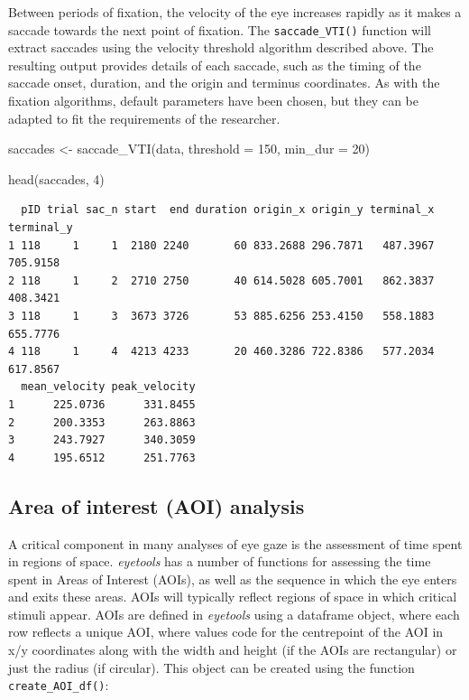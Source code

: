 \documentclass[
  man,
  floatsintext,
  longtable,
  nolmodern,
  notxfonts,
  notimes,
  colorlinks=true,linkcolor=blue,citecolor=blue,urlcolor=blue]{apa7}
\newenvironment{Shaded}{\begin{snugshade}}{\end{snugshade}}
\newcommand{\AttributeTok}[1]{\textcolor[rgb]{0.40,0.45,0.13}{#1}}
\newcommand{\DecValTok}[1]{\textcolor[rgb]{0.68,0.00,0.00}{#1}}
\newcommand{\FunctionTok}[1]{\textcolor[rgb]{0.28,0.35,0.67}{#1}}
\newcommand{\NormalTok}[1]{\textcolor[rgb]{0.00,0.23,0.31}{#1}}
\newcommand{\OtherTok}[1]{\textcolor[rgb]{0.00,0.23,0.31}{#1}}
\begin{document}
Between periods of fixation, the velocity of the eye increases rapidly
as it makes a saccade towards the next point of fixation. The
\texttt{saccade\_VTI()} function will extract saccades using the
velocity threshold algorithm described above. The resulting output
provides details of each saccade, such as the timing of the saccade
onset, duration, and the origin and terminus coordinates. As with the
fixation algorithms, default parameters have been chosen, but they can
be adapted to fit the requirements of the researcher.

\begin{Shaded}
\begin{Highlighting}[]
\NormalTok{saccades }\OtherTok{\textless{}{-}} \FunctionTok{saccade\_VTI}\NormalTok{(data,}
                        \AttributeTok{threshold =} \DecValTok{150}\NormalTok{,}
                        \AttributeTok{min\_dur =} \DecValTok{20}\NormalTok{)}

\FunctionTok{head}\NormalTok{(saccades, }\DecValTok{4}\NormalTok{)}
\end{Highlighting}
\end{Shaded}

\begin{verbatim}
  pID trial sac_n start  end duration origin_x origin_y terminal_x terminal_y
1 118     1     1  2180 2240       60 833.2688 296.7871   487.3967   705.9158
2 118     1     2  2710 2750       40 614.5028 605.7001   862.3837   408.3421
3 118     1     3  3673 3726       53 885.6256 253.4150   558.1883   655.7776
4 118     1     4  4213 4233       20 460.3286 722.8386   577.2034   617.8567
  mean_velocity peak_velocity
1      225.0736      331.8455
2      200.3353      263.8863
3      243.7927      340.3059
4      195.6512      251.7763
\end{verbatim}

\subsection{Area of interest (AOI)
analysis}\label{area-of-interest-aoi-analysis}

A critical component in many analyses of eye gaze is the assessment of
time spent in regions of space. \emph{eyetools} has a number of
functions for assessing the time spent in Areas of Interest (AOIs), as
well as the sequence in which the eye enters and exits these areas. AOIs
will typically reflect regions of space in which critical stimuli
appear. AOIs are defined in \emph{eyetools} using a dataframe object,
where each row reflects a unique AOI, where values code for the
centrepoint of the AOI in x/y coordinates along with the width and
height (if the AOIs are rectangular) or just the radius (if circular).
This object can be created using the function
\texttt{create\_AOI\_df()}:
\end{document}
